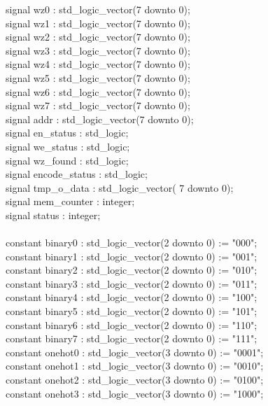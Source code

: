 \documentclass{article}
\begin{document}
{\selectfont
signal wz0 : std\_logic\_vector(7 downto 0);\\
signal wz1 : std\_logic\_vector(7 downto 0);\\
signal wz2 : std\_logic\_vector(7 downto 0);\\
signal wz3 : std\_logic\_vector(7 downto 0);\\
signal wz4 : std\_logic\_vector(7 downto 0);\\
signal wz5 : std\_logic\_vector(7 downto 0);\\
signal wz6 : std\_logic\_vector(7 downto 0);\\
signal wz7 : std\_logic\_vector(7 downto 0);\\
signal addr : std\_logic\_vector(7 downto 0);\\
signal en\_status : std\_logic;\\
signal we\_status : std\_logic;\\
signal wz\_found : std\_logic;\\
signal encode\_status : std\_logic;\\
signal tmp\_o\_data : std\_logic\_vector( 7 downto 0);\\
signal mem\_counter : integer;\\
signal status : integer;\\\\
constant binary0 : std\_logic\_vector(2 downto 0) := "000";\\
constant binary1 : std\_logic\_vector(2 downto 0) := "001";\\
constant binary2 : std\_logic\_vector(2 downto 0) := "010";\\
constant binary3 : std\_logic\_vector(2 downto 0) := "011";\\
constant binary4 : std\_logic\_vector(2 downto 0) := "100";\\
constant binary5 : std\_logic\_vector(2 downto 0) := "101";\\
constant binary6 : std\_logic\_vector(2 downto 0) := "110";\\
constant binary7 : std\_logic\_vector(2 downto 0) := "111";\\
constant onehot0 : std\_logic\_vector(3 downto 0) := "0001";\\
constant onehot1 : std\_logic\_vector(3 downto 0) := "0010";\\
constant onehot2 : std\_logic\_vector(3 downto 0) := "0100";\\
constant onehot3 : std\_logic\_vector(3 downto 0) := "1000";\\\\
}
\end{document}
